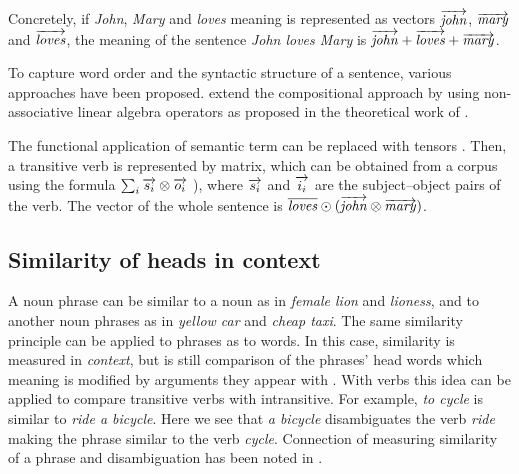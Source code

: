 Concretely, if \textit{John}, \textit{Mary} and \textit{loves} meaning is
represented as vectors $\overrightarrow{\mathit{john}}$, $\overrightarrow{\mathit{mary}}$ and
$\overrightarrow{\mathit{loves}}$, the meaning of the sentence \textit{John loves Mary} is
$\overrightarrow{\mathit{john}} + \overrightarrow{\mathit{loves}} + \overrightarrow{\mathit{mary}}$.

To capture word order and the syntactic structure of a sentence, various approaches have been proposed.  extend the compositional approach by using non-associative linear algebra operators as proposed in the theoretical work of .

The functional application of semantic term can be replaced with tensors \cite{Bourbaki1998commutative}. Then, a transitive verb is represented by matrix, which can be obtained from a corpus using the formula $\sum_i\overrightarrow{s_i} \otimes \overrightarrow{o_i}$ \cite{Grefenstette:2011:ESC:2145432.2145580}), where $\overrightarrow{s_i}$ and $\overrightarrow{i_i}$ are the subject--object pairs of the verb. The vector of the whole sentence is $\overline{\mathit{loves}} \odot(\overrightarrow{\mathit{john}} \otimes \overrightarrow{\mathit{mary}})$.

\subsection{Similarity of heads in context}
\label{sec:similarity-context}

A noun phrase can be similar to a noun as in \textit{female lion} and \textit{lioness}, and to another noun phrases as in \textit{yellow car} and \textit{cheap taxi}. The same similarity principle can be applied to phrases as to words. In this case, similarity is measured in \emph{context}, but is still comparison of the phrases' head words which meaning is modified by arguments they appear with \cite{Kintsch2001173,mitchell-lapata:2008:ACLMain,mitchell2010composition,Dinu:2010:MDS:1870658.1870771,Baroni2010nouns,thater-furstenau-pinkal:2011:IJCNLP-2011,Seaghdha:2011:PMS:2145432.2145545}. With verbs this idea can be applied to compare transitive verbs with intransitive. For example, \textit{to cycle} is similar to \textit{ride a bicycle}. Here we see that \textit{a bicycle} disambiguates the verb \textit{ride} making the phrase similar to the verb \textit{cycle}. Connection of measuring similarity of a phrase and disambiguation has been noted in .


